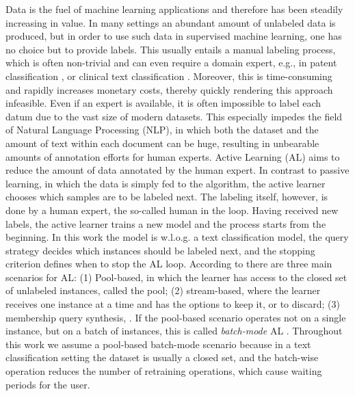 

\label{sec:introduction}
Data is the fuel of machine learning applications and therefore has been steadily increasing in value.
In many settings an abundant amount of unlabeled data is produced,
but in order to use such data in supervised machine learning, 
one has no choice but to provide labels.
This usually entails a manual labeling process, which is often non-trivial and can even require a domain expert, 
e.g., in patent classification , or clinical text classification .
Moreover, this is time-consuming and rapidly increases monetary costs, thereby quickly rendering this approach infeasible.
Even if an expert is available, it is often impossible to label each datum due to the vast size of modern datasets.
This especially impedes the field of Natural Language Processing (NLP), 
in which both the dataset and the amount of text within each document can be huge,
resulting in unbearable amounts of annotation efforts for human experts.
Active Learning (AL) aims to reduce the amount of data annotated by the human expert.
In contrast to passive learning, in which the data is simply fed to the algorithm, 
the active learner chooses which samples are to be labeled next.  
The labeling itself, however, is done by a human expert, the so-called human in the loop.
Having received new labels, the active learner trains a new model and the process starts from the beginning.
In this work the model is w.l.o.g. a text classification model, 
the query strategy decides which instances should be labeled next, and the stopping criterion defines when to stop the AL loop.
According to \textcite{settles2010active} there are three main scenarios for AL:
(1) Pool-based, in which the learner has access to the closed set of unlabeled instances, called the pool;
(2) stream-based, where the learner receives one instance at a time and has the options to keep it, or to discard;
(3) membership query synthesis, .
If the pool-based scenario operates not on a single instance, but on a batch of instances, this is called {\em batch-mode} AL .
Throughout this work we assume a pool-based batch-mode scenario because in a text classification setting the dataset is usually a closed set, and the batch-wise operation reduces the number of retraining operations, which cause waiting periods for the user.\\
